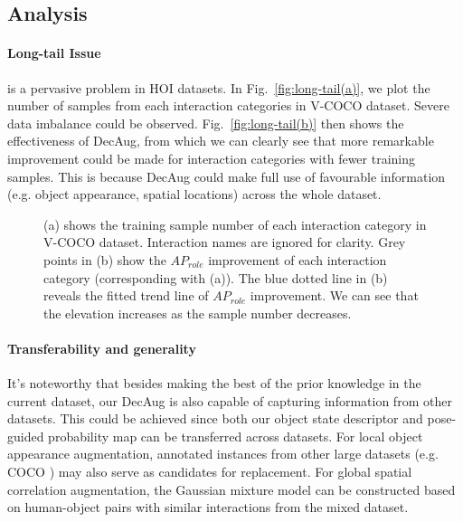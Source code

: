\documentclass[10pt,twocolumn,letterpaper]{article}
\begin{document}
\subsection{Analysis}
\paragraph{Long-tail Issue}
is a pervasive problem in HOI datasets. In Fig.~\ref{fig:long-tail(a)}, we plot the number of samples from each interaction categories in V-COCO dataset. Severe data imbalance could be observed.  Fig.~\ref{fig:long-tail(b)} then shows the effectiveness of DecAug, from which we can clearly see that more remarkable improvement could be made for interaction categories with fewer training samples. This is because DecAug could make full use of favourable information (e.g. object appearance, spatial locations) across the whole dataset.

\begin{figure}[t]
\centering

\caption{(a) shows the training sample number of each interaction category in V-COCO dataset. Interaction names are ignored for clarity. Grey points in (b) show the ${AP}_{role}$ improvement of each interaction category (corresponding with (a)). The blue dotted line in (b) reveals the fitted trend line of ${AP}_{role}$ improvement. We can see that the elevation increases as the sample number decreases.}
\label{fig:long-tail}
\end{figure}


\paragraph{Transferability and generality}




It's noteworthy that besides making the best of the prior knowledge in the current dataset, our DecAug is also capable of capturing information from other datasets. This could be achieved since both our object state descriptor and pose-guided probability map can be transferred across datasets. For local object appearance augmentation, annotated instances from other large datasets (e.g. COCO \cite{lin2014microsoft}) may also serve as candidates for replacement.
For global spatial correlation augmentation, the Gaussian mixture model can be constructed based on human-object pairs with similar interactions from the mixed dataset.
\end{document}

